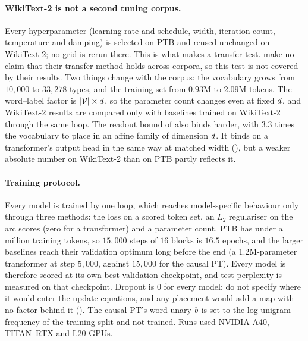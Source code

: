 \paragraph{WikiText-2 is not a second tuning corpus.}
Every hyperparameter (learning rate and schedule, width, iteration count, temperature and
damping) is selected on PTB and reused unchanged on WikiText-2; no grid is rerun there. This is
what makes  a transfer test. \citet{kuang2026scaling} make no claim that their
transfer method holds across corpora, so this test is not covered by their results. Two things change with the corpus: the vocabulary
grows from $10{,}000$ to $33{,}278$ types, and the training set from $0.93$M to $2.09$M tokens.
The word--label factor is $|\mathcal{V}| \times d$, so the parameter count changes even at fixed
$d$, and WikiText-2 results are compared only with baselines trained on WikiText-2 through
the same loop. The readout bound of  also binds harder, with $3.3$ times the
vocabulary to place in an affine family of dimension $d$. It binds on a transformer's output
head in the same way at matched width (), but a weaker absolute number on
WikiText-2 than on PTB partly reflects it.

\paragraph{Training protocol.}
Every model is trained by one loop, which reaches model-specific behaviour only through three
methods: the loss on a scored token set, an $L_2$ regulariser on the arc scores (zero for a
transformer) and a parameter count. PTB has under a million training tokens, so $15{,}000$ steps
of $16$ blocks is $16.5$ epochs, and the larger baselines reach their validation optimum long
before the end (a 1.2M-parameter transformer at step $5{,}000$, against $15{,}000$ for the
causal PT). Every model is therefore scored at its own best-validation checkpoint, and test
perplexity is measured on that checkpoint. Dropout is $0$ for every model: \citet{wu2023probabilistic} do not
specify where it would enter the update equations, and any placement would add a map with no
factor behind it (). The causal PT's word unary $b$ is set to the log
unigram frequency of the training split and not trained. Runs used NVIDIA A40, TITAN~RTX and
L20 GPUs.

